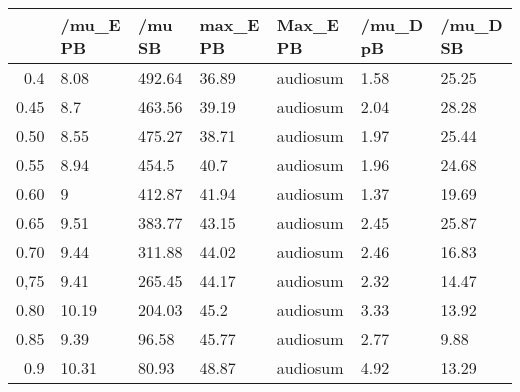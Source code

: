 \begin{table}[ht]
\centering
\begin{tabular}{rllllll}
  \hline
 & /mu\_E PB & /mu SB & max\_E PB & Max\_E PB & /mu\_D pB & /mu\_D SB \\ 
  \hline
0.4 & 8.08 & 492.64 & 36.89 & audiosum & 1.58 & 25.25 \\ 
  0.45 & 8.7 & 463.56 & 39.19 & audiosum & 2.04 & 28.28 \\ 
  0.50 & 8.55 & 475.27 & 38.71 & audiosum & 1.97 & 25.44 \\ 
  0.55 & 8.94 & 454.5 & 40.7 & audiosum & 1.96 & 24.68 \\ 
  0.60 & 9 & 412.87 & 41.94 & audiosum & 1.37 & 19.69 \\ 
  0.65 & 9.51 & 383.77 & 43.15 & audiosum & 2.45 & 25.87 \\ 
  0.70 & 9.44 & 311.88 & 44.02 & audiosum & 2.46 & 16.83 \\ 
  0,75 & 9.41 & 265.45 & 44.17 & audiosum & 2.32 & 14.47 \\ 
  0.80 & 10.19 & 204.03 & 45.2 & audiosum & 3.33 & 13.92 \\ 
  0.85 & 9.39 & 96.58 & 45.77 & audiosum & 2.77 & 9.88 \\ 
  0.9 & 10.31 & 80.93 & 48.87 & audiosum & 4.92 & 13.29 \\ 
   \hline
\end{tabular}
\end{table}
